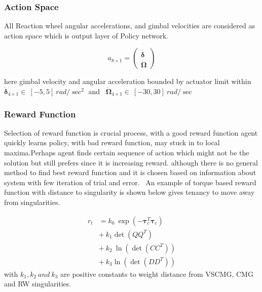 \subsubsection{Action Space}
All Reaction wheel angular accelerations, and gimbal velocities are considered as action space which is output layer of Policy network.

\begin{equation}
a_{8\times 1} =\begin{pmatrix}
\mathbf{\dot{\delta }}\\
\mathbf{\dot{\Omega }}
\end{pmatrix}
\end{equation}


\noindent here gimbal velocity and angular acceleration bounded by actuator limit within $\displaystyle \mathbf{\dot{\delta }}_{4\times 1} \in \ [ -5,5] \ rad/\sec^{2}$ and \ $\displaystyle \mathbf{\dot{\Omega }}_{4\times 1} \in \ [ -30,30] \ rad/\sec$
\subsubsection{Reward Function}
Selection of reward function is crucial process, with a good reward function agent quickly learns policy, with bad reward function, may stuck in to local maxima.Perhaps agent finds certain sequence of action which might not be the solution but still prefers since it is increasing reward. although there is no general method to find best reward function and it is chosen based on information about system with few iteration of trial and error. \ An example of torque based reward function with distance to singularity is shown below gives tenancy to move away from singularities.

\begin{equation}
\begin{aligned}
r_t & =k_{0} \ \exp\left( -\mathbf{\tau }^{T}_{c}\mathbf{\tau }_{c}\right)\\
 & +\ k_{1}\det\left( QQ^{T}\right) \ \\
 & +\ k_{2} \ \ln\left(\det\left( CC^{T}\right)\right)\\
 & +\ k_{3}\ln\left(\det\left( DD^{T}\right)\right)
\end{aligned}
\end{equation}with $\displaystyle k_{1} ,k_{2} \ and\ k_{3}$ are positive constants to weight distance from VSCMG, CMG and RW singularities.

